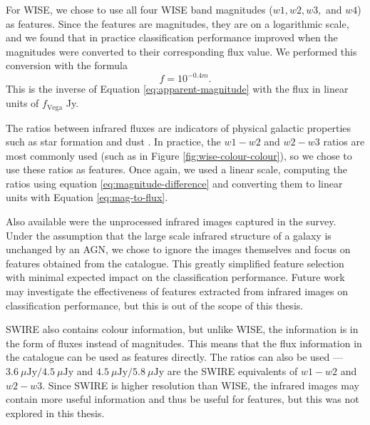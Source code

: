     For WISE, we chose to use all four WISE band magnitudes ($w1, w2, w3,$ and
    $w4$) as features. Since the features are magnitudes, they are on a
    logarithmic scale, and we found that in practice classification performance
    improved when the magnitudes were converted to their corresponding flux
    value. We performed this conversion with the formula
    \begin{equation}
      \label{eq:mag-to-flux}
      f = 10^{-0.4m}.
    \end{equation}
    This is the inverse of Equation \ref{eq:apparent-magnitude} with the flux in
    linear units of $f_{\text{Vega}}$ Jy.

    The ratios between infrared fluxes are indicators of physical galactic
    properties such as star formation and dust . In practice, the $w1 - w2$ and $w2 - w3$
    ratios are most commonly used (such as in Figure
    \ref{fig:wise-colour-colour}), so we chose to use these ratios as features.
    Once again, we used a linear scale, computing the ratios using equation
    \ref{eq:magnitude-difference} and converting them to linear units with
    Equation \ref{eq:mag-to-flux}.

    Also available were the unprocessed infrared images captured in the survey.
    Under the assumption that the large scale infrared structure of a galaxy is
    unchanged by an AGN, we chose to ignore the images themselves and focus on
    features obtained from the catalogue. This greatly simplified feature
    selection with minimal expected impact on the classification performance.
    Future work may investigate the effectiveness of features extracted from
    infrared images on classification performance, but this is out of the scope
    of this thesis.

    SWIRE also contains colour information, but unlike WISE, the information is
    in the form of fluxes instead of magnitudes. This means that the flux
    information in the catalogue can be used as features directly. The ratios
    can also be used --- $3.6\ \mu\text{Jy} / 4.5\ \mu\text{Jy}$ and $4.5\
    \mu\text{Jy} / 5.8\ \mu\text{Jy}$ are the SWIRE equivalents of $w1 - w2$ and
    $w2 - w3$. Since SWIRE is higher resolution than WISE, the
    infrared images may contain more useful information and thus be useful for
    features, but this was not explored in this thesis.


